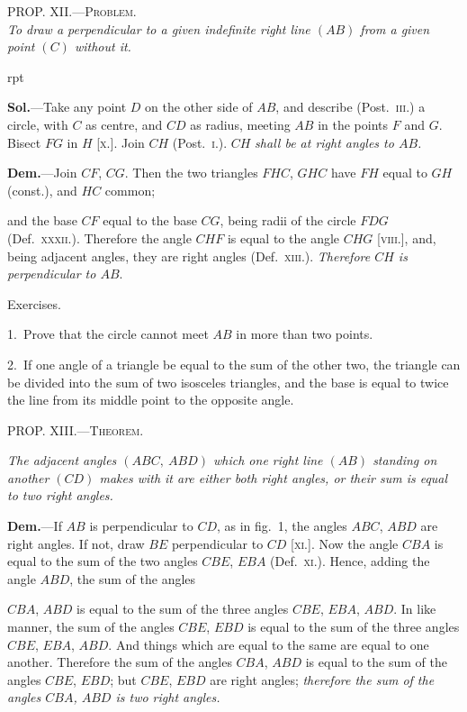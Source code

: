 \documentclass[oneside]{book}
\newcounter{wrapwidth}
\newcommand\myprop[2]{
\bigskip\Needspace*{4\baselineskip}\begin{center}\textsc{#1}\\\medskip\emph{#2}\par\end{center}
}
\newcommand\mypropl[2]{
\bigskip\Needspace*{4\baselineskip}\begin{center}\textsc{#1}\end{center}
\hspace{\parindent}\emph{#2}\par\medskip
}
\newcommand\exhead[1]{
\Needspace*{5\baselineskip}\begin{center}
\textsf{#1}
\end{center}
}
\newcommand\imgflow[3]{
\setcounter{wrapwidth}{#1}

\begin{wrapfigure}[#2]{r}{\value{wrapwidth}pt}
\begin{center}
\vspace{-0.3in}

\end{center}
\end{wrapfigure}
}
\newcommand\imgcent[2]{
\begin{center}

\end{center}
}
\begin{document}
\myprop{PROP\@. XII\@.---Problem.}{To draw a perpendicular to a given indefinite right line
$(AB)$ from a given point $(C)$ without it.}


\imgflow{180}{8}{f027}

\textbf{Sol.}---Take any point $D$ on the other side of $AB$, and
describe (Post.~\textsc{iii}.)
a circle, with $C$ as
centre, and $CD$ as
radius, meeting $AB$
in the points $F$ and $G$.
Bisect $FG$ in $H$ [\textsc{x}.].
Join $CH$ (Post.~\textsc{i}.).
$CH$ \textit{shall be at right
angles to $AB$.}

\textbf{Dem.}---Join $CF$, $CG$. Then the two triangles $FHC$,
$GHC$ have $FH$ equal to $GH$ (const.), and $HC$ common;

and the base $CF$ equal to the base $CG$, being radii of
the circle $FDG$ (Def.~\textsc{xxxii}.). Therefore the angle $CHF$
is equal to the angle $CHG$ [\textsc{viii}.], and, being adjacent
angles, they are right angles (Def.~\textsc{xiii}.). \emph{Therefore
$CH$ is perpendicular to $AB$}.


\exhead{Exercises.}

\begin{footnotesize}
1.~Prove that the circle cannot meet $AB$ in more than two
points.

2.~If one angle of a triangle be equal to the sum of the other two,
the triangle can be divided into the sum of two isosceles triangles,
and the base is equal to twice the line from its middle point to the
opposite angle.
\par\end{footnotesize}


\mypropl{PROP\@. XIII\@.---Theorem.}{The adjacent angles $(ABC,\ ABD)$ which one right line
$(AB)$ standing on another $(CD)$ makes with it are either
both right angles, or their sum is equal to two right
angles.}


\imgcent{230}{f028}

\textbf{Dem.}---If $AB$ is perpendicular to $CD$, as in fig.~1,
the angles $ABC$, $ABD$ are right angles. If not, draw
$BE$ perpendicular to $CD$ [\textsc{xi}.]. Now the angle $CBA$ is
equal to the sum of the two angles $CBE$, $EBA$ (Def.~\textsc{xi}.).
Hence, adding the angle $ABD$, the sum of the angles

$CBA$, $ABD$ is equal to the sum of the three angles $CBE$,
$EBA$, $ABD$. In like manner, the sum of the angles
$CBE$, $EBD$ is equal to the sum of the three angles
$CBE$, $EBA$, $ABD$. And things which are equal to the
same are equal to one another. Therefore the sum of
the angles $CBA$, $ABD$ is equal to the sum of the angles
$CBE$, $EBD$; but $CBE$, $EBD$ are right angles; \emph{therefore
the sum of the angles $CBA$, $ABD$ is two right angles.}
\end{document}
